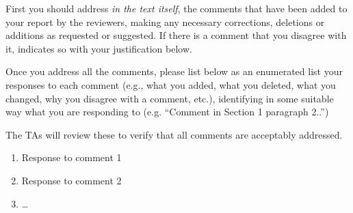 First you should address \emph{in the text itself},  the comments that have been added to your
report by the reviewers, making any necessary corrections, deletions
or additions as requested or suggested.  If there is a comment that you disagree with
it, indicates so with your justification below.


Once you address all the comments, please list below as an enumerated
list your responses to each comment (e.g., what you added, what you
deleted, what you changed, why you disagree with a comment, etc.),
identifying in some suitable way what you are responding to
(e.g. ``Comment in Section 1 paragraph 2..'')

The TAs will review these to verify that all comments are acceptably addressed.

\begin{enumerate}
\item Response to comment 1
\item Response to comment 2
\item \ldots
  
\end{enumerate}

